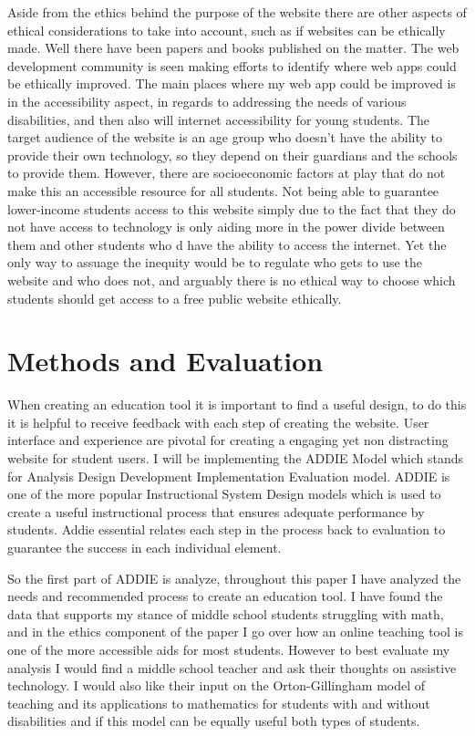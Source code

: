 \documentclass[10pt,twocolumn]{article}
\begin{document}
Aside from the ethics behind the purpose of the website there are other aspects of ethical considerations to take into account, such as if websites can be ethically made. Well there have been papers and books published on the matter. The web development community is seen making efforts to identify where web apps could be ethically improved. The main places where my web app could be improved is in the accessibility aspect, in regards to addressing the needs of various disabilities, and then also will internet accessibility for young students. The target audience of the website is an age group who doesn't have the ability to provide their own technology, so they depend on their guardians and the schools to provide them. However, there are socioeconomic factors at play that do not make this an accessible resource for all students. Not being able to guarantee lower-income students access to this website simply due to the fact that they do not have access to technology is only aiding more in the power divide between them and other students who d have the ability to access the internet. Yet the only way to assuage the inequity would be to regulate who gets to use the website and who does not, and arguably there is no ethical way to choose which students should get access to a free public website ethically.  


\section{Methods and Evaluation}
When creating an education tool it is important to find a useful design, to do this it is helpful to receive feedback with each step of creating the website. User interface and experience are pivotal for creating a engaging yet non distracting website for student users. I will be implementing the ADDIE Model which stands for Analysis Design Development Implementation Evaluation model. ADDIE is one of the more popular Instructional System Design models which is used to create a useful instructional process that ensures adequate performance by students. Addie essential relates each step in the process back to evaluation to guarantee the success in each individual element.\cite{borrelli_user_nodate}

So the first part of ADDIE is analyze, throughout this paper I have analyzed the needs and recommended process to create an education tool. I have found the data that supports my stance of middle school students struggling with math, and in the ethics component of the paper I go over how an online teaching tool is one of the more accessible aids for most students. However to best evaluate my analysis I would find a middle school teacher and ask their thoughts on assistive technology. I would also like their input on the Orton-Gillingham model of teaching and its applications to mathematics for students with and without disabilities and if this model can be equally useful both types of students. 
\end{document}
